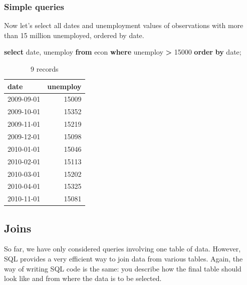 \documentclass[
  12pt,
]{style/krantz}
\newenvironment{Shaded}{\begin{snugshade}}{\end{snugshade}}
\newcommand{\DataTypeTok}[1]{\textcolor[rgb]{0.13,0.29,0.53}{#1}}
\newcommand{\DecValTok}[1]{\textcolor[rgb]{0.00,0.00,0.81}{#1}}
\newcommand{\KeywordTok}[1]{\textcolor[rgb]{0.13,0.29,0.53}{\textbf{#1}}}
\newcommand{\NormalTok}[1]{#1}
\newcommand{\OperatorTok}[1]{\textcolor[rgb]{0.81,0.36,0.00}{\textbf{#1}}}
\begin{document}
\hypertarget{simple-queries}{%
\subsubsection{Simple queries}\label{simple-queries}}

Now let's select all dates and unemployment values of observations with more than 15 million unemployed, ordered by date.

\begin{Shaded}
\begin{Highlighting}[]
\KeywordTok{select} \DataTypeTok{date}\NormalTok{, }
\NormalTok{unemploy }\KeywordTok{from}\NormalTok{ econ }
\KeywordTok{where}\NormalTok{ unemploy }\OperatorTok{\textgreater{}} \DecValTok{15000}
\KeywordTok{order} \KeywordTok{by} \DataTypeTok{date}\NormalTok{;}
\end{Highlighting}
\end{Shaded}

\begin{table}

\caption{\label{tab:unnamed-chunk-62}9 records}
\centering
\begin{tabular}[t]{l|r}
\hline
date & unemploy\\
\hline
2009-09-01 & 15009\\
\hline
2009-10-01 & 15352\\
\hline
2009-11-01 & 15219\\
\hline
2009-12-01 & 15098\\
\hline
2010-01-01 & 15046\\
\hline
2010-02-01 & 15113\\
\hline
2010-03-01 & 15202\\
\hline
2010-04-01 & 15325\\
\hline
2010-11-01 & 15081\\
\hline
\end{tabular}
\end{table}

\hypertarget{joins}{%
\subsection{Joins}\label{joins}}

So far, we have only considered queries involving one table of data. However, SQL provides a very efficient way to join data from various tables. Again, the way of writing SQL code is the same: you describe how the final table should look like and from where the data is to be selected.
\end{document}
